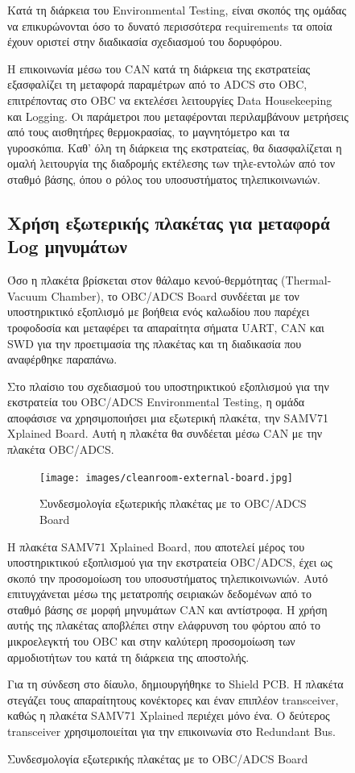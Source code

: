\documentclass[a4paper,nobib,justified]{tufte-book}
\begin{document}
\begin{figure}
Κατά τη διάρκεια του Environmental Testing, είναι σκοπός της ομάδας να επικυρώνονται όσο το δυνατό περισσότερα requirements τα οποία έχουν οριστεί στην διαδικασία σχεδιασμού του δορυφόρου.

Η επικοινωνία μέσω του CAN κατά τη διάρκεια της εκστρατείας εξασφαλίζει τη μεταφορά παραμέτρων από το ADCS στο OBC, επιτρέποντας στο OBC να εκτελέσει λειτουργίες Data Housekeeping και Logging. Οι παράμετροι που μεταφέρονται περιλαμβάνουν μετρήσεις από τους αισθητήρες θερμοκρασίας, το μαγνητόμετρο και τα γυροσκόπια. Καθ' όλη τη διάρκεια της εκστρατείας, θα διασφαλίζεται η ομαλή λειτουργία της διαδρομής εκτέλεσης των τηλε-εντολών από τον σταθμό βάσης, όπου ο ρόλος του υποσυστήματος τηλεπικοινωνιών.

\subsection{Χρήση εξωτερικής πλακέτας για μεταφορά Log μηνυμάτων}
Όσο η πλακέτα βρίσκεται στον θάλαμο κενού-θερμότητας (Thermal-Vacuum Chamber), το OBC/ADCS Board συνδέεται με τον υποστηρικτικό εξοπλισμό με βοήθεια ενός καλωδίου που παρέχει τροφοδοσία και μεταφέρει τα απαραίτητα σήματα UART, CAN και SWD για την προετιμασία της πλακέτας και τη διαδικασία που αναφέρθηκε παραπάνω.

Στο πλαίσιο του σχεδιασμού του υποστηρικτικού εξοπλισμού για την εκστρατεία του OBC/ADCS Environmental Testing, η ομάδα αποφάσισε να χρησιμοποιήσει μια εξωτερική πλακέτα, την SAMV71 Xplained Board. Αυτή η πλακέτα θα συνδέεται μέσω CAN με την πλακέτα OBC/ADCS. 

\begin{figure}
	\texttt{[image: images/cleanroom-external-board.jpg]}
	\label{fig:cleanroom-external-board}
	\caption{Συνδεσμολογία εξωτερικής πλακέτας με το OBC/ADCS Board}
\end{figure}
Η πλακέτα SAMV71 Xplained Board, που αποτελεί μέρος του υποστηρικτικού εξοπλισμού για την εκστρατεία OBC/ADCS, έχει ως σκοπό την προσομοίωση του υποσυστήματος τηλεπικοινωνιών. Αυτό επιτυγχάνεται μέσω της μετατροπής σειριακών δεδομένων από το σταθμό βάσης σε μορφή μηνυμάτων CAN και αντίστροφα. Η χρήση αυτής της πλακέτας αποβλέπει στην ελάφρυνση του φόρτου από το μικροελεγκτή του OBC και στην καλύτερη προσομοίωση των αρμοδιοτήτων του κατά τη διάρκεια της αποστολής.

Για τη σύνδεση στο δίαυλο, δημιουργήθηκε το Shield PCB. Η πλακέτα στεγάζει τους απαραίτητους κονέκτορες και έναν επιπλέον transceiver, καθώς η πλακέτα SAMV71 Xplained περιέχει μόνο ένα. Ο δεύτερος transceiver χρησιμοποιείται για την επικοινωνία στο Redundant Bus.


\end{figure}
\end{document}
